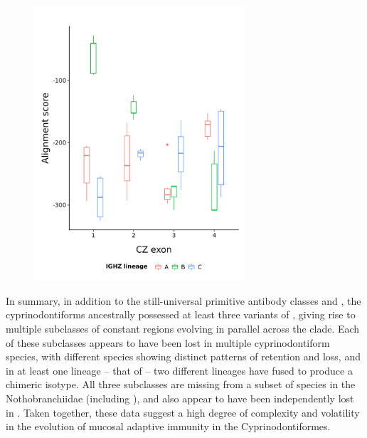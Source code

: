 \begin{figure}
	\centering
	\includegraphics[width=0.7\textwidth]{_Figures/png/ppl-cz-aln-aa.png}
	\label{fig:ppl-cz-aln}
\end{figure}
	
In summary, in addition to the still-universal primitive antibody classes  and , the cyprinodontiforms ancestrally possessed at least three variants of , giving rise to multiple subclasses of  constant regions evolving in parallel across the clade. Each of these subclasses appears to have been lost in multiple cyprinodontiform species, with different species showing distinct patterns of retention and loss, and in at least one lineage -- that of  -- two different  lineages have fused to produce a chimeric isotype. All three subclasses are missing from a subset of species in the Nothobranchiidae (including \nfu), and also appear to have been independently lost in . Taken together, these data suggest a high degree of complexity and volatility in the evolution of mucosal adaptive immunity in the Cyprinodontiformes.

